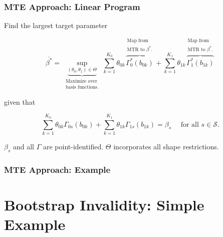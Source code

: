 \documentclass[11pt, aspectratio=169]{beamer}
\newcommand{\indep}{\perp\!\!\!\!\perp}
\begin{document}




\begin{frame}
    \frametitle{MTE Approach: Linear Program}

    Find the largest target parameter


    \begin{equation*}
        \overline{\beta^*} = \underbrace{\sup_{(\theta_0, \theta_1) \in \Theta}}_{\substack{\text{Maximize over} \\ \text{basis functions.}}}\sum_{k=1}^{K_0} \theta_{0k}\overbrace{\Gamma^*_0(b_{0k})}^{\substack{\text{Map from} \\ \text{MTR to } \beta^*.}} + \sum_{k=1}^{K_1} \theta_{1k}\overbrace{\Gamma^*_1(b_{1k})}^{\substack{\text{Map from} \\ \text{MTR to } \beta^*.}}
    \end{equation*}

    \pause

    given that

    \begin{equation*}
        \sum_{k=1}^{K_0} \theta_{0k}\Gamma_{0s}(b_{0k}) + \sum_{k=1}^{K_1} \theta_{1k} \Gamma_{1s}(b_{1k}) = \beta_s \quad \text{ for all } s\in\mathcal{S}.
    \end{equation*}

    \vspace{0.5cm}
    $\beta_s$ and all $\Gamma$ are point-identified.
    $\Theta$ incorporates all shape restrictions.

\end{frame}

\begin{frame}
    \frametitle{MTE Approach: Example}

\end{frame}

\section{Bootstrap Invalidity: Simple Example}
\end{document}
